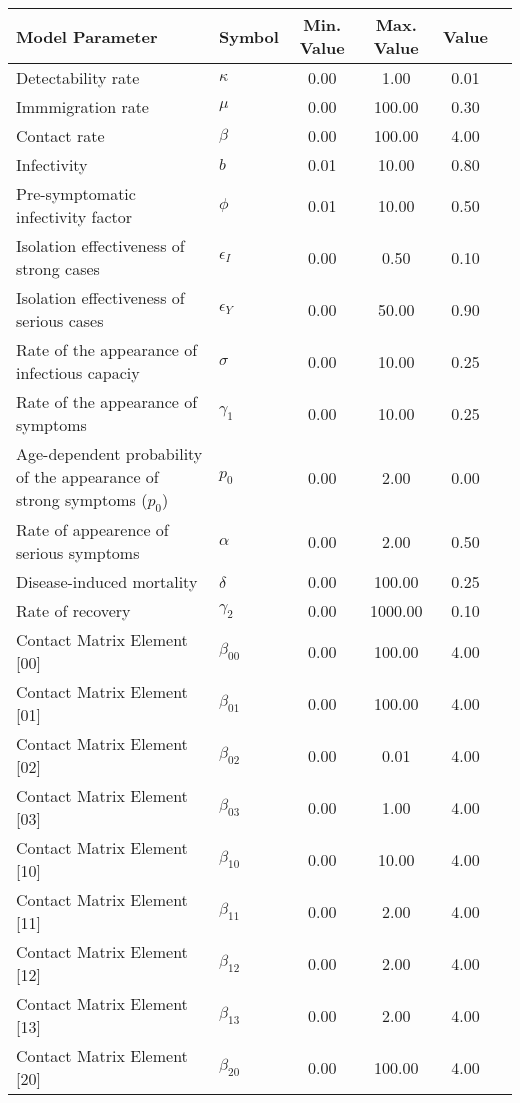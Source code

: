 \begin{table}
\centering
\begin{tabular}{p{5cm}lcccc}
{\bf Model Parameter} & {\bf Symbol} & {\bf Min. Value} & {\bf Max. Value} & {\bf Value}\\
\hline\hline
Detectability rate & $\kappa$ & 0.00 & 1.00 & 0.01\\
Immmigration rate & $\mu$ & 0.00 & 100.00 & 0.30\\
Contact rate & $\beta$ & 0.00 & 100.00 & 4.00\\
Infectivity & $b$ & 0.01 & 10.00 & 0.80\\
Pre-symptomatic infectivity factor & $\phi$ & 0.01 & 10.00 & 0.50\\
Isolation effectiveness of strong cases & $\epsilon_I$ & 0.00 & 0.50 & 0.10\\
Isolation effectiveness of serious cases & $\epsilon_Y$ & 0.00 & 50.00 & 0.90\\
Rate of the appearance of infectious capaciy & $\sigma$ & 0.00 & 10.00 & 0.25\\
Rate of the appearance of symptoms & $\gamma_1$ & 0.00 & 10.00 & 0.25\\
Age-dependent probability of the appearance of strong symptoms ($p_0$) & $p_0$ & 0.00 & 2.00 & 0.00\\
Rate of appearence of serious symptoms & $\alpha$ & 0.00 & 2.00 & 0.50\\
Disease-induced mortality & $\delta$ & 0.00 & 100.00 & 0.25\\
Rate of recovery & $\gamma_2$ & 0.00 & 1000.00 & 0.10\\
Contact Matrix Element [00] & $\beta_{00}$ & 0.00 & 100.00 & 4.00\\
Contact Matrix Element [01] & $\beta_{01}$ & 0.00 & 100.00 & 4.00\\
Contact Matrix Element [02] & $\beta_{02}$ & 0.00 & 0.01 & 4.00\\
Contact Matrix Element [03] & $\beta_{03}$ & 0.00 & 1.00 & 4.00\\
Contact Matrix Element [10] & $\beta_{10}$ & 0.00 & 10.00 & 4.00\\
Contact Matrix Element [11] & $\beta_{11}$ & 0.00 & 2.00 & 4.00\\
Contact Matrix Element [12] & $\beta_{12}$ & 0.00 & 2.00 & 4.00\\
Contact Matrix Element [13] & $\beta_{13}$ & 0.00 & 2.00 & 4.00\\
Contact Matrix Element [20] & $\beta_{20}$ & 0.00 & 100.00 & 4.00\\

\end{tabular}
\end{table}
